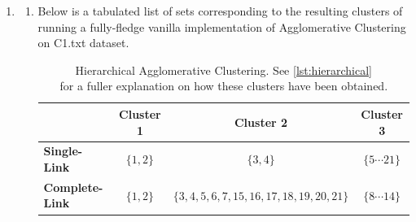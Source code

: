 \documentclass{article}
\begin{document}
\begin{enumerate}[leftmargin={*}, font={\bf}, label={\arabic*.}, ref={\arabic*}]
  \item \label{qst:1}
    \begin{enumerate}[label={(\Alph*)}, ref={\theenumi(\Alph*)}]
      \item \label{qst:1A}
        Below is a tabulated list of sets corresponding to the resulting clusters of
        running a fully-fledge vanilla implementation of {\sf Agglomerative Clustering}
        on {\sf C1.txt} dataset.
        \begin{table}[H]
          \centering
          \begin{tabular}{|l|c|c|c|}
            \hline
            & {\bf Cluster 1} & {\bf Cluster 2} & {\bf Cluster 3} \\ \hline
            {\bf Single-Link} & $\{1,2\}$ & $\{3,4\}$ & $\{5 \cdots 21\}$ \\
            {\bf Complete-Link} & $\{1,2\}$ & $\{3,4,5,6,7,15,16,17,18,19,20,21\}$ & $\{8 \cdots 14\}$ \\ \hline
          \end{tabular}
          \caption{
            Hierarchical Agglomerative Clustering. See \autoref{lst:hierarchical} \\
            for a fuller explanation on how these clusters have been obtained.
          }
          \label{tbl:hierarchical}
        \end{table}


\end{enumerate}
\end{enumerate}
\end{document}
